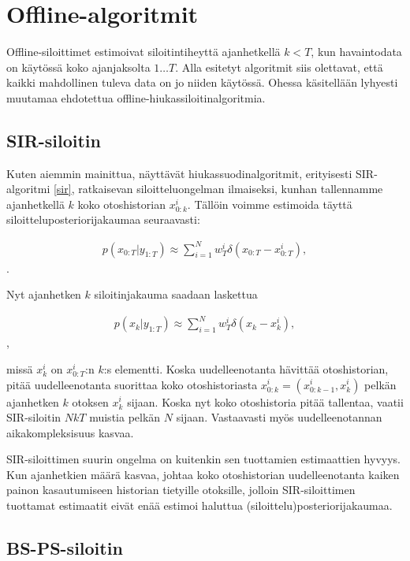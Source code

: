 \documentclass[
  12pt,
  a4paper, twoside]{book}
\begin{document}
\section{Offline-algoritmit}

Offline-siloittimet estimoivat siloitintiheyttä ajanhetkellä \(k<T\), kun havaintodata on käytössä koko ajanjaksolta \(1 \ldots T\). Alla esitetyt algoritmit siis olettavat, että kaikki mahdollinen tuleva data on jo niiden käytössä. Ohessa käsitellään lyhyesti muutamaa ehdotettua offline-hiukassiloitinalgoritmia.

\subsection{SIR-siloitin}

Kuten aiemmin mainittua, näyttävät hiukassuodinalgoritmit, erityisesti SIR-algoritmi \ref{sir}, ratkaisevan siloitteluongelman ilmaiseksi, kunhan tallennamme ajanhetkellä \(k\) koko otoshistorian \(x_{0:k}^i\). Tällöin voimme estimoida täyttä siloitteluposteriorijakaumaa seuraavasti:

\begin{align}\label{siloitin-posteriori}
p(x_{0:T}|y_{1:T}) \approx \sum_{i=1}^N w_T^i \delta (x_{0:T}-x_{0:T}^i),
\end{align}.

Nyt ajanhetken \(k\) siloitinjakauma saadaan laskettua

\begin{align}\label{siloitin-posteriori-k}
p(x_{k}|y_{1:T}) \approx \sum_{i=1}^N w_T^i \delta (x_{k}-x_{k}^i),
\end{align},

missä \(x^i_k\) on \(x^i_{0:T}\):n \(k\):s elementti. Koska uudelleenotanta hävittää otoshistorian, pitää uudelleenotanta suorittaa koko otoshistoriasta \(x_{0:k}^i = (x_{0:k-1}^i, x_{k}^i)\) pelkän ajanhetken \(k\) otoksen \(x_{k}^i\) sijaan. Koska nyt koko otoshistoria pitää tallentaa, vaatii SIR-siloitin \(NkT\) muistia pelkän \(N\) sijaan. Vastaavasti myös uudelleenotannan aikakompleksisuus kasvaa. \citep{kitagawa-1996}

SIR-siloittimen suurin ongelma on kuitenkin sen tuottamien estimaattien hyvyys. Kun ajanhetkien määrä kasvaa, johtaa koko otoshistorian uudelleenotanta kaiken painon kasautumiseen historian tietyille otoksille, jolloin SIR-siloittimen tuottamat estimaatit eivät enää estimoi haluttua (siloittelu)posteriorijakaumaa. \citep{kitagawa-1996}

\subsection{BS-PS-siloitin}
\end{document}
